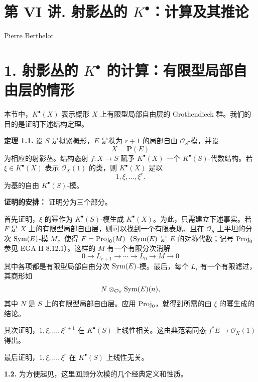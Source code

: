 \section*{第 VI 讲. 射影丛的 \(K^\bullet\)：计算及其推论}
\begin{center}
Pierre Berthelot
\end{center}

\section*{1. 射影丛的 \(K^\bullet\) 的计算：有限型局部自由层的情形}

本节中，\(K^\bullet(X)\) 表示概形 \(X\) 上有限型局部自由层的 Grothendieck 群。我们的目的是证明下述结构定理。

\textbf{定理 1.1.} 设 \(S\) 是拟紧概形，\(E\) 是秩为 \(r+1\) 的局部自由 \(\mathcal O_S\)-模，并设
\[
  X=\mathbf P(E)
\]
为相应的射影丛。结构态射 \(f:X\to S\) 赋予 \(K^\bullet(X)\) 一个 \(K^\bullet(S)\)-代数结构。若 \(\xi\in K^\bullet(X)\) 表示 \(\mathcal O_X(1)\) 的类，则 \(K^\bullet(X)\) 是以
\[
  1,\xi,\ldots,\xi^r .
\]
为基的自由 \(K^\bullet(S)\)-模。

\noindent\textbf{证明的安排：}
证明分为三个部分。

首先证明，\(\xi\) 的幂作为 \(K^\bullet(S)\)-模生成 \(K^\bullet(X)\)。为此，只需建立下述事实。若 \(F\) 是 \(X\) 上的有限型局部自由层，则可以找到一个有限表现、且在 \(\mathcal O_S\) 上平坦的分次 \(\operatorname{Sym}(E)\)-模 \(M\)，使得 \(F=\operatorname{Proj}_0(M)\)（\(\operatorname{Sym}(E)\) 是 \(E\) 的对称代数；记号 \(\operatorname{Proj}_0\) 参见 EGA II 8.12.1）。这样的 \(M\) 有一个有限分次消解
\[
  0\longrightarrow L_{r+1}\longrightarrow \cdots \longrightarrow L_0\longrightarrow M\longrightarrow 0
\]
其中各项都是有限型局部自由分次 \(\operatorname{Sym}(E)\)-模。最后，每个 \(L_i\) 有一个有限滤过，其商形如
\[
  N\otimes_{\mathcal O_S}\operatorname{Sym}(E)(n),
\]
其中 \(N\) 是 \(S\) 上的有限型局部自由层。应用 \(\operatorname{Proj}_0\)，就得到所需的由 \(\xi\) 的幂生成的结论。

其次证明，\(1,\xi,\ldots,\xi^{r+1}\) 在 \(K^\bullet(S)\) 上线性相关。这由典范满同态 \(f^*E\to\mathcal O_X(1)\) 得出。

最后证明，\(1,\xi,\ldots,\xi^r\) 在 \(K^\bullet(S)\) 上线性无关。

\noindent\textbf{1.2.}
为方便起见，这里回顾分次模的几个经典定义和性质。


